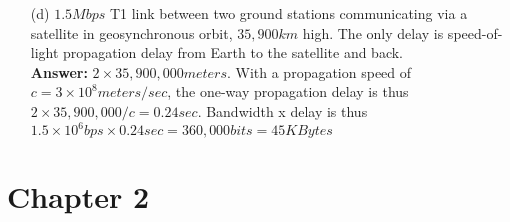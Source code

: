 \documentclass[a4paper]{article}
\begin{document}
\begin{itemize}
\begin{itemize}
	      	\item[(d)] $1.5 Mbps$ T1 link between two ground stations communicating via a satellite in geosynchronous orbit, $35,900 km$ high. The only delay is speed-of-light propagation delay from Earth to the satellite and back. \\
	      	      \textbf{Answer:} $2 \times 35,900,000 meters$. With a propagation speed of $c = 3 \times 10^8 meters/sec$, the one-way propagation delay is thus $2 \times 35,900,000/c = 0.24 sec$. Bandwidth x delay is thus $1.5 \times 10^6 bps \times 0.24 sec = 360,000 bits = 45 KBytes$ 
	      \end{itemize}
\end{itemize}

\section*{Chapter 2}
\end{document}
